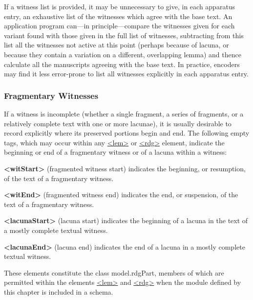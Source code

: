 If a witness list is provided, it may be unnecessary to give, in each apparatus entry, an exhaustive list of the witnesses which agree with the base text. An application program can—in principle—compare the witnesses given for each variant found with those given in the full list of witnesses, subtracting from this list all the witnesses not active at this point (perhaps because of lacuna, or because they contain a variation on a different, overlapping lemma) and thence calculate all the manuscripts agreeing with the base text. In practice, encoders may find it less error-prone to list all witnesses explicitly in each apparatus entry.
\subsubsection[{Fragmentary Witnesses}]{Fragmentary Witnesses}\label{TCAPMI}\par
If a witness is incomplete (whether a single fragment, a series of fragments, or a relatively complete text with one or more lacunae), it is usually desirable to record explicitly where its preserved portions begin and end. The following empty tags, which may occur within any \hyperref[TEI.lem]{<lem>} or \hyperref[TEI.rdg]{<rdg>} element, indicate the beginning or end of a fragmentary witness or of a lacuna within a witness: 
\begin{sansreflist}
  
\item [\textbf{<witStart>}] (fragmented witness start) indicates the beginning, or resumption, of the text of a fragmentary witness.
\item [\textbf{<witEnd>}] (fragmented witness end) indicates the end, or suspension, of the text of a fragmentary witness.
\item [\textbf{<lacunaStart>}] (lacuna start) indicates the beginning of a lacuna in the text of a mostly complete textual witness.
\item [\textbf{<lacunaEnd>}] (lacuna end) indicates the end of a lacuna in a mostly complete textual witness.
\end{sansreflist}
 These elements constitute the class \textsf{model.rdgPart}, members of which are permitted within the elements \hyperref[TEI.lem]{<lem>} and \hyperref[TEI.rdg]{<rdg>} when the module defined by this chapter is included in a schema.\par
